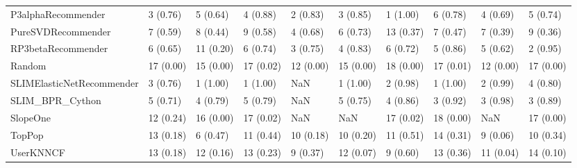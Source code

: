 \begin{tabular}{llllllllll}
                 P3alphaRecommender &                 3 (0.76) &    5 (0.64) &      4 (0.88) &     2 (0.83) &             3 (0.85) &            1 (1.00) &          6 (0.78) &           4 (0.69) &          5 (0.74) \\
                 PureSVDRecommender &                 7 (0.59) &    8 (0.44) &      9 (0.58) &     4 (0.68) &             6 (0.73) &           13 (0.37) &          7 (0.47) &           7 (0.39) &          9 (0.36) \\
                 RP3betaRecommender &                 6 (0.65) &   11 (0.20) &      6 (0.74) &     3 (0.75) &             4 (0.83) &            6 (0.72) &          5 (0.86) &           5 (0.62) &          2 (0.95) \\
                             Random &                17 (0.00) &   15 (0.00) &     17 (0.02) &    12 (0.00) &            15 (0.00) &           18 (0.00) &         17 (0.01) &          12 (0.00) &         17 (0.00) \\
          SLIMElasticNetRecommender &                 3 (0.76) &    1 (1.00) &      1 (1.00) &          NaN &             1 (1.00) &            2 (0.98) &          1 (1.00) &           2 (0.99) &          4 (0.80) \\
                    SLIM\_BPR\_Cython &                 5 (0.71) &    4 (0.79) &      5 (0.79) &          NaN &             5 (0.75) &            4 (0.86) &          3 (0.92) &           3 (0.98) &          3 (0.89) \\
                           SlopeOne &                12 (0.24) &   16 (0.00) &     17 (0.02) &          NaN &                  NaN &           17 (0.02) &         18 (0.00) &                NaN &         17 (0.00) \\
                             TopPop &                13 (0.18) &    6 (0.47) &     11 (0.44) &    10 (0.18) &            10 (0.20) &           11 (0.51) &         14 (0.31) &           9 (0.06) &         10 (0.34) \\
                          UserKNNCF &                13 (0.18) &   12 (0.16) &     13 (0.23) &     9 (0.37) &            12 (0.07) &            9 (0.60) &         13 (0.36) &          11 (0.04) &         14 (0.10) \\
\bottomrule
\end{tabular}
